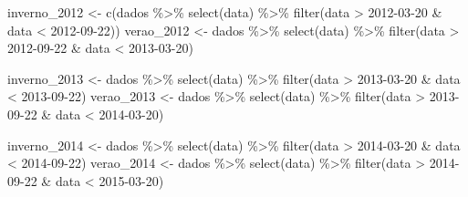 \documentclass[
]{article}
\newenvironment{Shaded}{\begin{snugshade}}{\end{snugshade}}
\newcommand{\FunctionTok}[1]{\textcolor[rgb]{0.00,0.00,0.00}{#1}}
\newcommand{\NormalTok}[1]{#1}
\newcommand{\OtherTok}[1]{\textcolor[rgb]{0.56,0.35,0.01}{#1}}
\newcommand{\SpecialCharTok}[1]{\textcolor[rgb]{0.00,0.00,0.00}{#1}}
\newcommand{\StringTok}[1]{\textcolor[rgb]{0.31,0.60,0.02}{#1}}
\begin{document}
\begin{Shaded}
\begin{Highlighting}[]
\NormalTok{inverno\_2012 }\OtherTok{\textless{}{-}} \FunctionTok{c}\NormalTok{(dados }\SpecialCharTok{\%\textgreater{}\%} \FunctionTok{select}\NormalTok{(data) }\SpecialCharTok{\%\textgreater{}\%} \FunctionTok{filter}\NormalTok{(data }\SpecialCharTok{\textgreater{}} \StringTok{\textquotesingle{}2012{-}03{-}20\textquotesingle{}} \SpecialCharTok{\&}\NormalTok{ data }\SpecialCharTok{\textless{}} \StringTok{\textquotesingle{}2012{-}09{-}22\textquotesingle{}}\NormalTok{))}
\NormalTok{verao\_2012 }\OtherTok{\textless{}{-}}\NormalTok{ dados }\SpecialCharTok{\%\textgreater{}\%} \FunctionTok{select}\NormalTok{(data) }\SpecialCharTok{\%\textgreater{}\%}  \FunctionTok{filter}\NormalTok{(data }\SpecialCharTok{\textgreater{}} \StringTok{\textquotesingle{}2012{-}09{-}22\textquotesingle{}} \SpecialCharTok{\&}\NormalTok{ data }\SpecialCharTok{\textless{}} \StringTok{\textquotesingle{}2013{-}03{-}20\textquotesingle{}}\NormalTok{)}

\NormalTok{inverno\_2013 }\OtherTok{\textless{}{-}}\NormalTok{ dados }\SpecialCharTok{\%\textgreater{}\%} \FunctionTok{select}\NormalTok{(data) }\SpecialCharTok{\%\textgreater{}\%} \FunctionTok{filter}\NormalTok{(data }\SpecialCharTok{\textgreater{}} \StringTok{\textquotesingle{}2013{-}03{-}20\textquotesingle{}} \SpecialCharTok{\&}\NormalTok{ data }\SpecialCharTok{\textless{}} \StringTok{\textquotesingle{}2013{-}09{-}22\textquotesingle{}}\NormalTok{)}
\NormalTok{verao\_2013 }\OtherTok{\textless{}{-}}\NormalTok{ dados }\SpecialCharTok{\%\textgreater{}\%} \FunctionTok{select}\NormalTok{(data) }\SpecialCharTok{\%\textgreater{}\%}  \FunctionTok{filter}\NormalTok{(data }\SpecialCharTok{\textgreater{}} \StringTok{\textquotesingle{}2013{-}09{-}22\textquotesingle{}} \SpecialCharTok{\&}\NormalTok{ data }\SpecialCharTok{\textless{}} \StringTok{\textquotesingle{}2014{-}03{-}20\textquotesingle{}}\NormalTok{)}

\NormalTok{inverno\_2014 }\OtherTok{\textless{}{-}}\NormalTok{ dados }\SpecialCharTok{\%\textgreater{}\%} \FunctionTok{select}\NormalTok{(data) }\SpecialCharTok{\%\textgreater{}\%} \FunctionTok{filter}\NormalTok{(data }\SpecialCharTok{\textgreater{}} \StringTok{\textquotesingle{}2014{-}03{-}20\textquotesingle{}} \SpecialCharTok{\&}\NormalTok{ data }\SpecialCharTok{\textless{}} \StringTok{\textquotesingle{}2014{-}09{-}22\textquotesingle{}}\NormalTok{)}
\NormalTok{verao\_2014 }\OtherTok{\textless{}{-}}\NormalTok{ dados }\SpecialCharTok{\%\textgreater{}\%} \FunctionTok{select}\NormalTok{(data) }\SpecialCharTok{\%\textgreater{}\%}  \FunctionTok{filter}\NormalTok{(data }\SpecialCharTok{\textgreater{}} \StringTok{\textquotesingle{}2014{-}09{-}22\textquotesingle{}} \SpecialCharTok{\&}\NormalTok{ data }\SpecialCharTok{\textless{}} \StringTok{\textquotesingle{}2015{-}03{-}20\textquotesingle{}}\NormalTok{)}


\end{Highlighting}
\end{Shaded}
\end{document}
